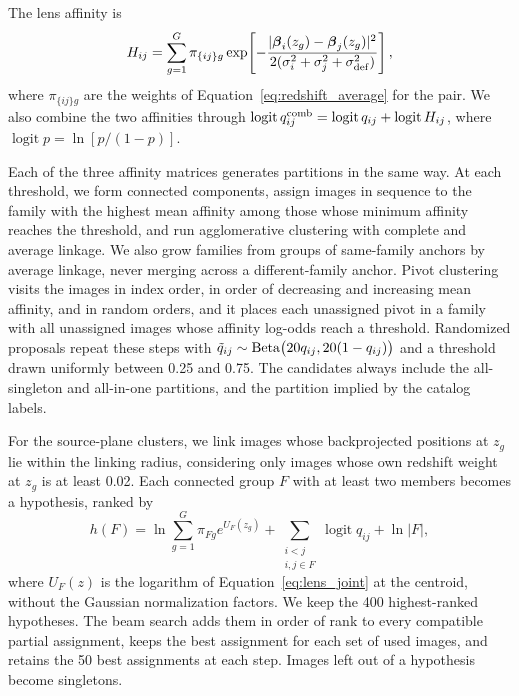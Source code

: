 \documentclass[twocolumn,twocolappendix,linenumbers]{aastex701}
\newcommand{\logit}{\operatorname{logit}}
\begin{document}
The lens affinity is
\begin{equation}
H_{ij}=\sum_{g=1}^{G}\pi_{\{ij\}g}\exp\!\left[-\frac{|\boldsymbol\beta_i(z_g)-\boldsymbol\beta_j(z_g)|^2}{2(\sigma_i^2+\sigma_j^2+\sigma_{\rm def}^2)}\right],
\label{eq:lens_affinity}
\end{equation}
where $\pi_{\{ij\}g}$ are the weights of Equation~\ref{eq:redshift_average} for the pair.
We also combine the two affinities through $\logit q^{\rm comb}_{ij}=\logit q_{ij}+\logit H_{ij}$, where $\logit p=\ln[p/(1-p)]$.

Each of the three affinity matrices generates partitions in the same way.
At each threshold, we form connected components, assign images in sequence to the family with the highest mean affinity among those whose minimum affinity reaches the threshold, and run agglomerative clustering with complete and average linkage.
We also grow families from groups of same-family anchors by average linkage, never merging across a different-family anchor.
Pivot clustering visits the images in index order, in order of decreasing and increasing mean affinity, and in random orders, and it places each unassigned pivot in a family with all unassigned images whose affinity log-odds reach a threshold.
Randomized proposals repeat these steps with $\tilde q_{ij}\sim{\rm Beta}\big(20q_{ij},20(1-q_{ij})\big)$ and a threshold drawn uniformly between 0.25 and 0.75.
The candidates always include the all-singleton and all-in-one partitions, and the partition implied by the catalog labels.

For the source-plane clusters, we link images whose backprojected positions at $z_g$ lie within the linking radius, considering only images whose own redshift weight at $z_g$ is at least 0.02.
Each connected group $F$ with at least two members becomes a hypothesis, ranked by
\begin{equation}
h(F)=\ln\sum_{g=1}^{G}\pi_{Fg}e^{U_F(z_g)}+\sum_{\substack{i<j\\i,j\in F}}\logit q_{ij}+\ln|F|,
\label{eq:beam}
\end{equation}
where $U_F(z)$ is the logarithm of Equation~\ref{eq:lens_joint} at the centroid, without the Gaussian normalization factors.
We keep the 400 highest-ranked hypotheses.
The beam search adds them in order of rank to every compatible partial assignment, keeps the best assignment for each set of used images, and retains the 50 best assignments at each step.
Images left out of a hypothesis become singletons.

{}

\end{document}
